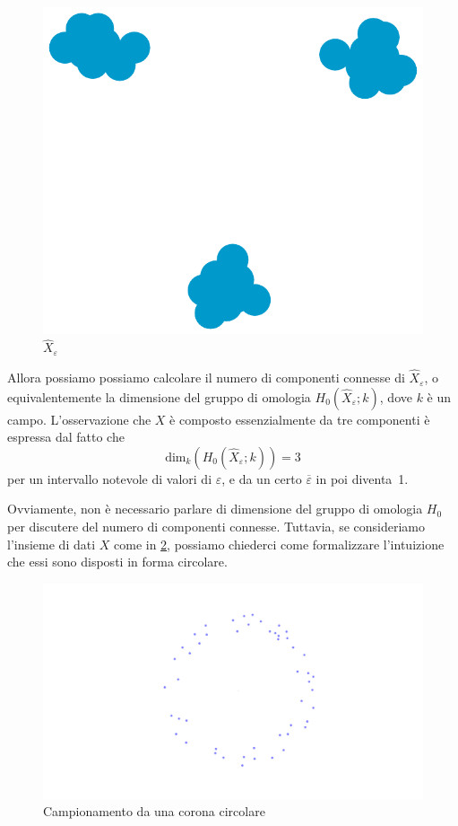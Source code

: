 \begin{figure}[h]
  \begin{center}
    \includegraphics[width=.4\linewidth]{gfx/three_clusters_fat.pdf}
    \caption{$\widehat{X}_\varepsilon$}
    \label{fig:clusters_fat}
  \end{center}
\end{figure}

Allora possiamo possiamo calcolare il numero di componenti connesse di $\widehat{X}_\varepsilon$, o equivalentemente la dimensione del gruppo di omologia $H_{0}(\widehat{X}_\varepsilon;k)$, dove $k$ è un campo. L'osservazione che $X$ è composto essenzialmente da tre componenti è espressa dal fatto che
\begin{equation*}
  \mathrm{dim}_k(H_{0}(\widehat{X}_\varepsilon;k))=3
\end{equation*}
per un intervallo notevole di valori di $\varepsilon$, e da un certo $\overline{\varepsilon}$ in poi diventa~1.

Ovviamente, non è necessario parlare di dimensione del gruppo di omologia $H_{0}$ per discutere del numero di componenti connesse. Tuttavia, se consideriamo l'insieme di dati $X$ come in \cref{fig:circle}, possiamo chiederci come formalizzare l'intuizione che essi sono disposti in forma circolare.

\begin{figure}[h]
  \begin{center}
    \includegraphics[width=\linewidth]{gfx/statistical_circle.pdf}
    \caption{Campionamento da una corona circolare}
    \label{fig:circle}
  \end{center}
\end{figure}

